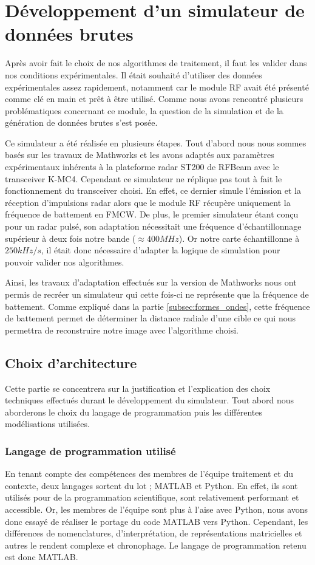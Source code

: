 \section{Développement d'un simulateur de données brutes}
\label{sec:simulateur}
Après avoir fait le choix de nos algorithmes de traitement, il faut les valider dans nos conditions expérimentales. Il était souhaité d'utiliser des données expérimentales assez rapidement, notamment car le module RF avait été présenté comme clé en main et prêt à être utilisé. Comme nous avons rencontré plusieurs problématiques concernant ce module, la question de la simulation et de la génération de données brutes s'est posée.

Ce simulateur a été réalisée en plusieurs étapes. Tout d'abord nous nous sommes basés sur les travaux de Mathworks \cite{mathworks_stripmap_sar} et les avons adaptés aux paramètres expérimentaux inhérents à la plateforme radar ST200 de RFBeam avec le transceiver K-MC4. Cependant ce simulateur ne réplique pas tout à fait le fonctionnement du transceiver choisi. En effet, ce dernier simule l'émission et la réception d'impulsions radar alors que le module RF récupère uniquement la fréquence de battement en FMCW. De plus, le premier simulateur étant conçu pour un radar pulsé, son adaptation nécessitait une fréquence d'échantillonnage supérieur à deux fois notre bande ($\approx400 MHz$). Or notre carte échantillonne à $250kHz/s$, il était donc nécessaire d'adapter la logique de simulation pour pouvoir valider nos algorithmes.

Ainsi, les travaux d'adaptation effectués sur la version de Mathworks nous ont permis de recréer un simulateur qui cette fois-ci ne représente que la fréquence de battement. Comme expliqué dans la partie \ref{subsec:formes_ondes}, cette fréquence de battement permet de déterminer la distance radiale d'une cible ce qui nous permettra de reconstruire notre image avec l'algorithme choisi. 

\subsection{Choix d'architecture}\label{subsec:choix_archi_simu}
Cette partie se concentrera sur la justification et l'explication des choix techniques effectués durant le développement du simulateur. Tout abord nous aborderons le choix du langage de programmation puis les différentes modélisations utilisées.

\subsubsection{Langage de programmation utilisé}\label{subsubsec:choix_langage_simu}
En tenant compte des compétences des membres de l'équipe traitement et du contexte, deux langages sortent du lot ; MATLAB et Python. En effet, ils sont utilisés pour de la programmation scientifique, sont relativement performant et accessible. Or, les membres de l'équipe sont plus à l'aise avec Python, nous avons donc essayé de réaliser le portage du code MATLAB vers Python. Cependant, les différences de nomenclatures, d'interprétation, de représentations matricielles et autres le rendent complexe et chronophage. Le langage de programmation retenu est donc MATLAB.

